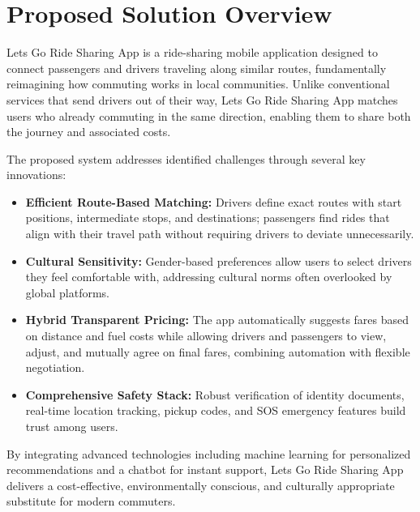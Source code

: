 
\section{Proposed Solution Overview}

Lets Go Ride Sharing App is a ride-sharing mobile application designed to connect passengers and drivers traveling along similar routes, fundamentally reimagining how commuting works in local communities. Unlike conventional services that send drivers out of their way, Lets Go Ride Sharing App matches users who already commuting in the same direction, enabling them to share both the journey and associated costs.

The proposed system addresses identified challenges through several key innovations:

\begin{itemize}
    \item \textbf{Efficient Route-Based Matching:} Drivers define exact routes with start positions, intermediate stops, and destinations; passengers find rides that align with their travel path without requiring drivers to deviate unnecessarily.
    
    \item \textbf{Cultural Sensitivity:} Gender-based preferences allow users to select drivers they feel comfortable with, addressing cultural norms often overlooked by global platforms.
    
    \item \textbf{Hybrid Transparent Pricing:} The app automatically suggests fares based on distance and fuel costs while allowing drivers and passengers to view, adjust, and mutually agree on final fares, combining automation with flexible negotiation.
    
    \item \textbf{Comprehensive Safety Stack:} Robust verification of identity documents, real-time location tracking, pickup codes, and SOS emergency features build trust among users.
\end{itemize}

By integrating advanced technologies including machine learning for personalized recommendations and a chatbot for instant support, Lets Go Ride Sharing App delivers a cost-effective, environmentally conscious, and culturally appropriate substitute for modern commuters.


